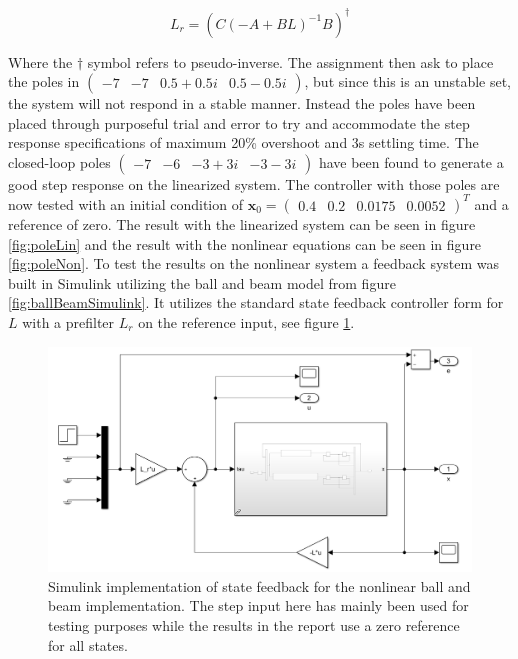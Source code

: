\documentclass[a4paper, titlepage]{article}
\begin{document}
\begin{equation}
L_r = (C(-A + BL)^{-1}B)^{\dagger}
\label{equ:prefilter}
\end{equation}

Where the $\dagger$ symbol refers to pseudo-inverse.
The assignment then ask to place the poles in $\begin{pmatrix} -7 & -7 & 0.5+0.5i & 0.5-0.5i \end{pmatrix}$, but since this is an unstable set, the system will not respond in a stable manner.
Instead the poles have been placed through purposeful trial and error to try and accommodate the step response specifications of maximum 20\% overshoot and 3s settling time.
The closed-loop poles $\begin{pmatrix} -7 & -6 & -3+3i & -3-3i \end{pmatrix}$ have been found to generate a good step response on the linearized system.
The controller with those poles are now tested with an initial condition of $\textbf{x}_0 = \begin{pmatrix} 0.4 & 0.2 & 0.0175 & 0.0052 \end{pmatrix}^T$ and a reference of zero.
The result with the linearized system can be seen in figure \ref{fig:poleLin} and the result with the nonlinear equations can be seen in figure \ref{fig:poleNon}.
To test the results on the nonlinear system a feedback system was built in Simulink utilizing the ball and beam model from figure \ref{fig:ballBeamSimulink}.
It utilizes the standard state feedback controller form for $L$ with a prefilter $L_r$ on the reference input, see figure \ref{fig:feedbackSys}.

\begin{figure}[h!]
\center
\includegraphics[scale=0.4]{../figures/feedbackSystemSimulink.png}
\caption{Simulink implementation of state feedback for the nonlinear ball and beam implementation. The step input here has mainly been used for testing purposes while the results in the report use a zero reference for all states.}
\label{fig:feedbackSys}
\end{figure}
\end{document}
